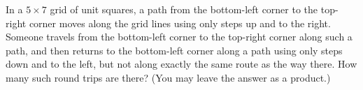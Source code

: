 In a $5\times7$ grid of unit squares, a path from the bottom-left corner to the top-right corner moves along the grid lines using only steps up and to the right. Someone travels from the bottom-left corner to the top-right corner along such a path, and then returns to the bottom-left corner along a path using only steps down and to the left, but not along exactly the same route as the way there. How many such round trips are there? (You may leave the answer as a product.)

